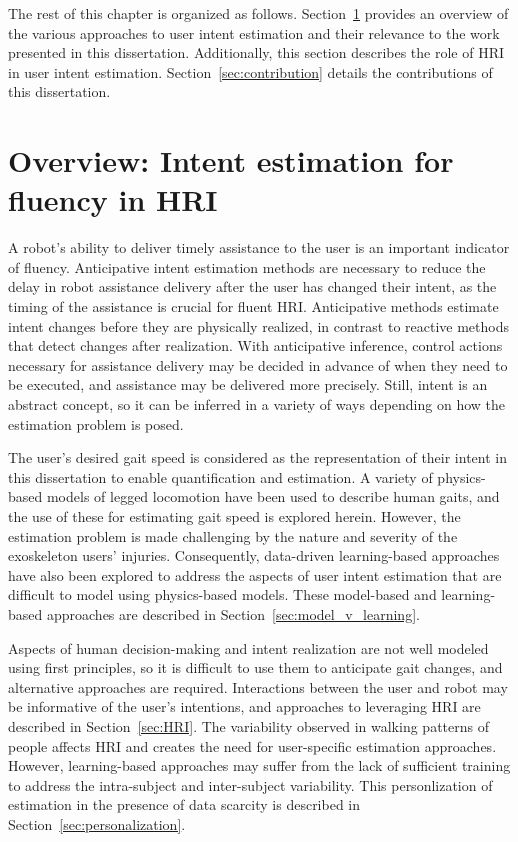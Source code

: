 The rest of this chapter is organized as follows. Section~\ref{sec:overview} provides an overview of the various approaches to user intent estimation and their relevance to the work presented in this dissertation. Additionally, this section describes the role of HRI in user intent estimation. Section~\ref{sec:contribution} details the contributions of this dissertation.

\section{Overview: Intent estimation for fluency in HRI} \label{sec:overview}

A robot's ability to deliver timely assistance to the user is an important indicator of fluency. Anticipative intent estimation methods are necessary to reduce the delay in robot assistance delivery after the user has changed their intent, as the timing of the assistance is crucial for fluent HRI. Anticipative methods estimate intent changes before they are physically realized, in contrast to reactive methods that detect changes after realization. With anticipative inference, control actions necessary for assistance delivery may be decided in advance of when they need to be executed, and assistance may be delivered more precisely. Still, intent is an abstract concept, so it can be inferred in a variety of ways depending on how the estimation problem is posed. 

The user's desired gait speed is considered as the representation of their intent in this dissertation to enable quantification and estimation. A variety of physics-based models of legged locomotion have been used to describe human gaits, and the use of these for estimating gait speed is explored herein. However, the estimation problem is made challenging by the nature and severity of the exoskeleton users' injuries. Consequently, data-driven learning-based approaches have also been explored to address the aspects of user intent estimation that are difficult to model using physics-based models. These model-based and learning-based approaches are described in Section~\ref{sec:model_v_learning}. 

Aspects of human decision-making and intent realization are not well modeled using first principles, so it is difficult to use them to anticipate gait changes, and alternative approaches are required. Interactions between the user and robot may be informative of the user's intentions, and approaches to leveraging HRI are described in Section~\ref{sec:HRI}. The variability observed in walking patterns of people affects HRI and creates the need for user-specific estimation approaches. However, learning-based approaches may suffer from the lack of sufficient training to address the intra-subject and inter-subject variability. This personlization of estimation in the presence of data scarcity is described in Section~\ref{sec:personalization}.

